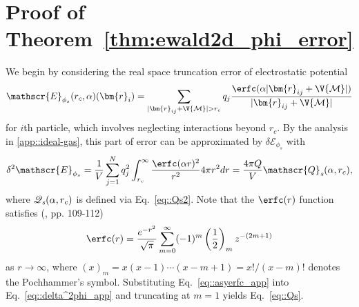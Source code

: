 \section{Proof of Theorem~\ref{thm:ewald2d_phi_error}}\label{app:phierr}
We begin by considering the real space truncation error of electrostatic potential 
\begin{equation}
	\mathscr{E}_{\phi_{s}}(r_c,\alpha)(\bm{r}_{i}) = \sum_{|\bm{r}_{ij} + \V{\mathcal{M}}|>r_c}q_{j} \frac{\erfc(\alpha|\bm{r}_{ij} + \V{\mathcal{M}}|)}{|\bm{r}_{ij} + \V{\mathcal{M}}|}
\end{equation}
for $i$th particle, which involves neglecting interactions beyond $r_c$. By the analysis in \ref{app::ideal-gas}, this part of error can be approximated by $\delta\mathscr{E}_{\phi_{s}}$ with 
\begin{equation}\label{eq::delta^2phi_app}
	\delta^2\mathscr{E}_{\phi_{s}}=  \frac{1}{V}\sum_{j=1}^{N}q_{j}^2\int_{r_c}^{\infty}\frac{\erfc(\alpha r)^2}{r^2}4\pi r^2dr=\frac{4\pi Q}{V}\mathscr{Q}_{\emph{s}}(\alpha,r_c),
\end{equation}
where $\mathscr{Q}_{\emph{s}}(\alpha,r_c)$ is defined via Eq.~\eqref{eq::Qs2}. Note that the $\erfc(r)$ function satisfies (\cite{olver1997asymptotics}, pp. 109-112)
\begin{equation}\label{eq::asyerfc_app}
	\erfc(r)=\frac{e^{-r^2}}{\sqrt{\pi}}\sum_{m=0}^{\infty}(-1)^{m}\left(\frac{1}{2}\right)_mz^{-(2m+1)}
\end{equation}
as $r\rightarrow \infty$, where $(x)_m=x(x-1)\cdots(x-m+1)=x!/(x-m)!$ denotes the Pochhammer's symbol. Substituting Eq.~\eqref{eq::asyerfc_app} into Eq.~\eqref{eq::delta^2phi_app} and truncating at $m=1$ yields Eq.~\eqref{eq::Qs}. 

